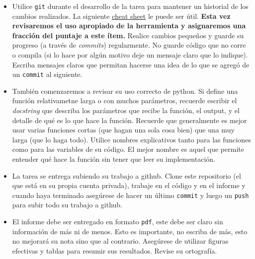 \documentclass[letter, 11pt]{article}
\begin{document}
\pagebreak
\vspace{1em}
\begin{itemize}

  \item Utilice \texttt{git} durante el desarrollo de la tarea para mantener un
    historial de los cambios realizados. La siguiente
    \href{https://education.github.com/git-cheat-sheet-education.pdf}{cheat
      sheet} le puede ser útil. {\bf Esta vez revisaremos el uso apropiado de
    la herramienta y asignaremos una fracción del puntaje a este ítem.} Realice
    cambios pequeños y guarde su progreso (a través de \emph{commits})
    regularmente. No guarde código que no corre o compila (si lo hace por algún
    motivo deje un mensaje claro que lo indique). Escriba mensajes claros que
    permitan hacerse una idea de lo que se agregó de un \texttt{commit} al
    siguiente.

  \item También comenzaremos a revisar su uso correcto de python. Si define una
    función relativametne larga o con muchos parámetros, recuerde escribir el
    \emph{docstring} que describa los parámetros que recibe la función, el
    output, y el detalle de qué es lo que hace la función. Recuerde que
    generalmente es mejor usar varias funciones cortas (que hagan una sola cosa
    bien) que una muy larga (que lo haga todo).  Utilice nombres explicativos
    tanto para las funciones como para las variables de su código. El mejor
    nombre es aquel que permite entender qué hace la función sin tener que leer
    su implementación.

  \item La tarea se entrega subiendo su trabajo a github. Clone este
    repositorio (el que está en su propia cuenta privada), trabaje en el código
    y en el informe y cuando haya terminado asegúrese de hacer un último
    \texttt{commit} y luego un \texttt{push} para subir todo su trabajo a
    github.

  \item El informe debe ser entregado en formato \texttt{pdf}, este debe ser
    claro sin información de más ni de menos. Esto es importante, no escriba de
    más, esto no mejorará su nota sino que al contrario. Asegúrese de utilizar
    figuras efectivas y tablas para resumir sus resultados. Revise su
    ortografía.

\end{itemize}


\end{document}
